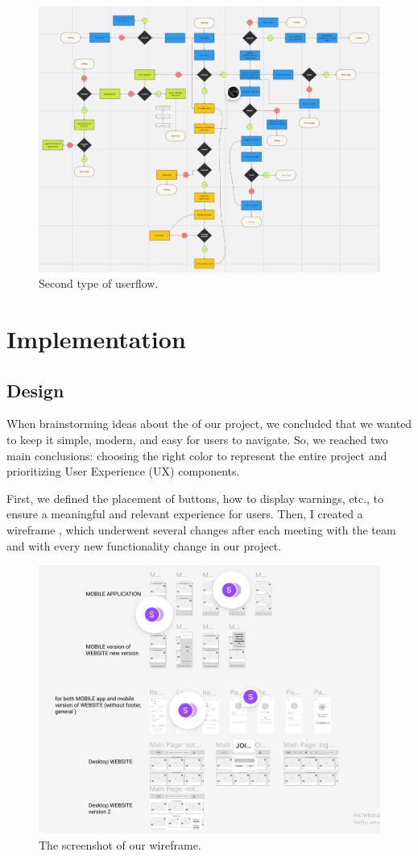 \begin{figure}[ht]\label{fig:userflow2}
  \centering
  \includegraphics[width=0.8\linewidth]{figures/Userflow - 1.png}
  \caption{Second type of userflow.}
\end{figure}

\newpage
\section{Implementation}\label{impl}
\subsection{Design}\label{des}
When brainstorming ideas about the  of our project, we concluded that we wanted to keep it simple, modern, and easy for users to navigate. So, we reached two main conclusions: choosing the right color to represent the entire project and prioritizing User Experience (UX) \cite{design} components.

First, we defined the placement of buttons, how to display warnings, etc., to ensure a meaningful and relevant experience for users. Then, I created a wireframe \cite{wireframe}, which underwent several changes after each meeting with the team and with every new functionality change in our project.

\begin{figure}[ht]\label{fig:wireframe}
  \centering
  \includegraphics[width=0.8\linewidth]{figures/wireframe.png}
  \caption{The screenshot of our wireframe.}
\end{figure}

